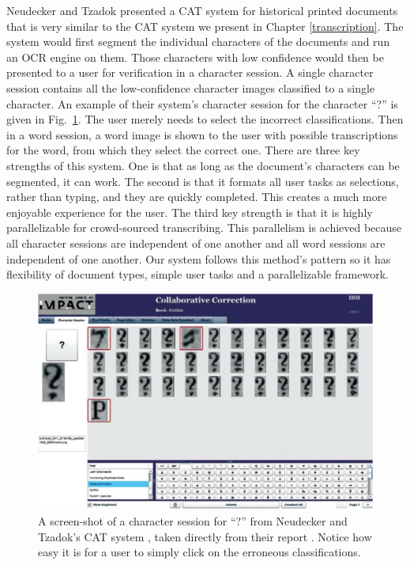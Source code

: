 \documentclass[ms,electronic,twosidetoc,letterpaper,chaptercenter,parttop,lol,lof,lot]{byumsphd}
\begin{document}
Neudecker and Tzadok \cite{Neudecker2010} presented a CAT system for historical printed documents that is very similar to the CAT system we present in Chapter \ref{transcription}. The system would first segment the individual characters of the documents and run an OCR engine on them. Those characters with low confidence would then be presented to a user for verification in a character session. A single character session contains all the low-confidence character images classified to a single character. An example of their system's character session for the character ``?'' is given in Fig.~\ref{fig:carpet}.  The user merely needs to select the incorrect classifications. Then in a word session, a word image is shown to the user with possible transcriptions for the word, from which they select the correct one. There are three key strengths of this system. One is that as long as the document’s characters can be segmented, it can work. The second is that it formats all user tasks as selections, rather than typing, and they are quickly completed. This creates a much more enjoyable experience for the user. The third key strength is that it is highly parallelizable for crowd-sourced transcribing. This parallelism is achieved because all character sessions are independent of one another and all word sessions are independent of one another. Our system follows this method's pattern so it has flexibility of document types, simple user tasks and a parallelizable framework.

\begin{figure}
    \centering
    \includegraphics[width=.85\textwidth]{carpet}
    \caption{A screen-shot of a character session for ``?'' from Neudecker and Tzadok's CAT system \cite{Neudecker2010}, taken directly from their report \cite{Neudecker2010}. Notice how easy it is for a user to simply click on the erroneous classifications.}
    \label{fig:carpet}
\end{figure}
\end{document}
